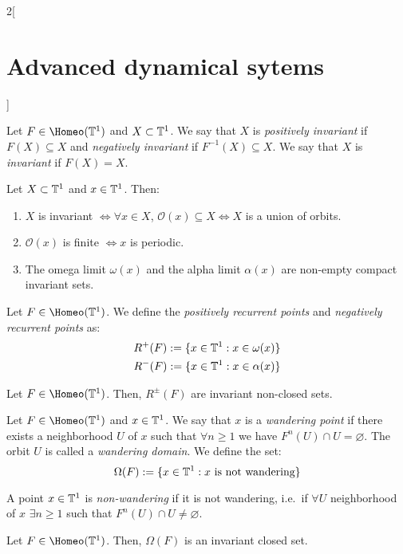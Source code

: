 \documentclass[../../../main_math.tex]{subfiles}
\begin{document}
\begin{multicols}{2}[\section{Advanced dynamical sytems}]
\begin{definition}
  \end{definition}
  \begin{definition}
    Let $F\in\Homeo(\TT^1)$ and $X\subset \mathbb{T}^1$. We say that $X$ is \emph{positively invariant} if $F(X)\subseteq X$ and \emph{negatively invariant} if $F^{-1}(X)\subseteq X$. We say that $X$ is \emph{invariant} if $F(X)=X$.
  \end{definition}
  \begin{proposition}
    Let $X\subset \mathbb{T}^1$ and $x\in \mathbb{T}^1$. Then:
    \begin{enumerate}
      \item $X$ is invariant $\iff \forall x\in X$, $\mathcal{O}(x)\subseteq X\iff X$ is a union of orbits.
      \item $\mathcal{O}(x)$ is finite $\iff x$ is periodic.
      \item The omega limit $\omega(x)$ and the alpha limit $\alpha(x)$ are non-empty compact invariant sets.
    \end{enumerate}
  \end{proposition}
  \begin{definition}
    Let $F\in \Homeo(\TT^1)$. We define the \emph{positively recurrent points} and \emph{negatively recurrent points} as:
    \begin{align*}
      R^+(F):=\{x\in\mathbb{T}^1:x\in\omega(x)\} \\
      R^-(F):=\{x\in\mathbb{T}^1:x\in\alpha(x)\}
    \end{align*}
  \end{definition}
  \begin{proposition}
    Let $F\in \Homeo(\TT^1)$. Then, $R^\pm(F)$ are invariant non-closed sets.
  \end{proposition}
  \begin{definition}
    Let $F\in \Homeo(\TT^1)$ and $x\in \mathbb{T}^1$. We say that $x$ is a \emph{wandering point} if there exists a neighborhood $U$ of $x$ such that $\forall n\geq 1$ we have $F^n(U)\cap U=\varnothing$. The orbit $U$ is called a \emph{wandering domain}. We define the set:
    $$
      \Omega(F):=\{ x\in\mathbb{T}^1: x\text{ is not wandering}\}
    $$
  \end{definition}
  \begin{remark}
    A point $x\in\mathbb{T}^1$ is \emph{non-wandering} if it is not wandering, i.e.\ if $\forall U$ neighborhood of $x$ $\exists n\geq 1$ such that $F^n(U)\cap U\ne\varnothing$.
  \end{remark}
  \begin{proposition}
    Let $F\in \Homeo(\TT^1)$. Then, $\Omega(F)$ is an invariant closed set.

\end{proposition}
\end{multicols}
\end{document}
